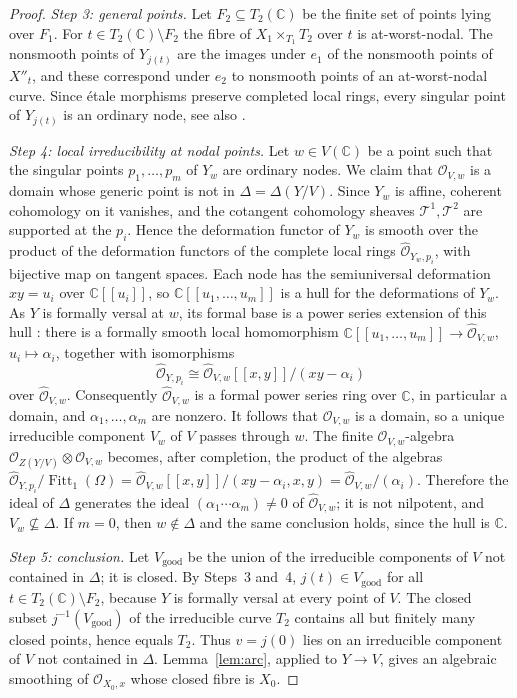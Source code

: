 \documentclass{amsart}
\theoremstyle{definition}
\theoremstyle{remark}
\numberwithin{equation}{section}
\newcommand{\C}{\mathbb{C}}
\DeclareMathOperator{\Fitt}{Fitt}
\begin{document}
\begin{proof}
\emph{Step 3: general points.} Let $F_2\subseteq T_2(\C)$ be the finite set of points lying over $F_1$. For $t\in T_2(\C)\setminus F_2$ the fibre of $X_1\times_{T_1}T_2$ over $t$ is at-worst-nodal. The nonsmooth points of $Y_{j(t)}$ are the images under $e_1$ of the nonsmooth points of $X''_t$, and these correspond under $e_2$ to nonsmooth points of an at-worst-nodal curve. Since \'etale morphisms preserve completed local rings, every singular point of $Y_{j(t)}$ is an ordinary node, see also \cite[Lemma~53.20.6 (Tag~0C5C)]{Sta}.

\emph{Step 4: local irreducibility at nodal points.} Let $w\in V(\C)$ be a point such that the singular points $p_1,\dots,p_m$ of $Y_w$ are ordinary nodes. We claim that $\mathcal O_{V,w}$ is a domain whose generic point is not in $\Delta=\Delta(Y/V)$. Since $Y_w$ is affine, coherent cohomology on it vanishes, and the cotangent cohomology sheaves $\mathcal T^1,\mathcal T^2$ are supported at the $p_i$. Hence the deformation functor of $Y_w$ is smooth over the product of the deformation functors of the complete local rings $\hat{\mathcal O}_{Y_w,p_i}$, with bijective map on tangent spaces. Each node has the semiuniversal deformation $xy=u_i$ over $\C[[u_i]]$, so $\C[[u_1,\dots,u_m]]$ is a hull \cite{Sch} for the deformations of $Y_w$. As $Y$ is formally versal at $w$, its formal base is a power series extension of this hull \cite[Section~90.14 (Tag~06T0), Lemma~90.14.5]{Sta}: there is a formally smooth local homomorphism $\C[[u_1,\dots,u_m]]\to\hat{\mathcal O}_{V,w}$, $u_i\mapsto\alpha_i$, together with isomorphisms
\[
\hat{\mathcal O}_{Y,p_i}\cong\hat{\mathcal O}_{V,w}[[x,y]]/(xy-\alpha_i)
\]
over $\hat{\mathcal O}_{V,w}$. Consequently $\hat{\mathcal O}_{V,w}$ is a formal power series ring over $\C$, in particular a domain, and $\alpha_1,\dots,\alpha_m$ are nonzero. It follows that $\mathcal O_{V,w}$ is a domain, so a unique irreducible component $V_w$ of $V$ passes through $w$. The finite $\mathcal O_{V,w}$-algebra $\mathcal O_{Z(Y/V)}\otimes\mathcal O_{V,w}$ becomes, after completion, the product of the algebras $\hat{\mathcal O}_{Y,p_i}/\Fitt_1(\Omega)=\hat{\mathcal O}_{V,w}[[x,y]]/(xy-\alpha_i,x,y)=\hat{\mathcal O}_{V,w}/(\alpha_i)$. Therefore the ideal of $\Delta$ generates the ideal $(\alpha_1\cdots\alpha_m)\ne0$ of $\hat{\mathcal O}_{V,w}$; it is not nilpotent, and $V_w\not\subseteq\Delta$. If $m=0$, then $w\notin\Delta$ and the same conclusion holds, since the hull is $\C$.

\emph{Step 5: conclusion.} Let $V_{\mathrm{good}}$ be the union of the irreducible components of $V$ not contained in $\Delta$; it is closed. By Steps~3 and~4, $j(t)\in V_{\mathrm{good}}$ for all $t\in T_2(\C)\setminus F_2$, because $Y$ is formally versal at every point of $V$. The closed subset $j^{-1}(V_{\mathrm{good}})$ of the irreducible curve $T_2$ contains all but finitely many closed points, hence equals $T_2$. Thus $v=j(0)$ lies on an irreducible component of $V$ not contained in $\Delta$. Lemma~\ref{lem:arc}, applied to $Y\to V$, gives an algebraic smoothing of $\mathcal O_{X_0,x}$ whose closed fibre is $X_0$.
\end{proof}
\end{document}
